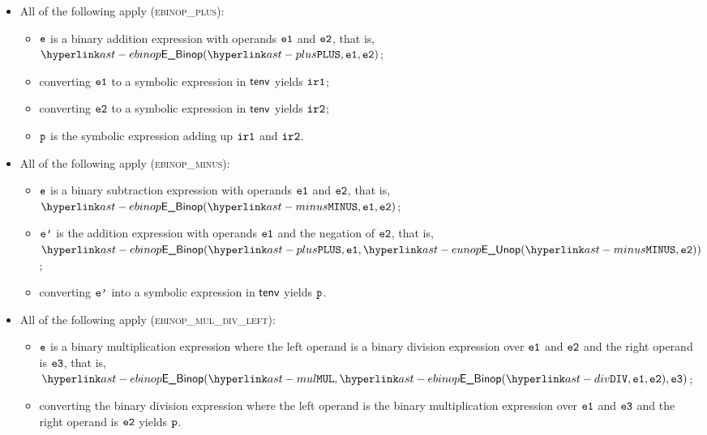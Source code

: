 \begin{itemize}
  \item All of the following apply (\textsc{ebinop\_plus}):
  \begin{itemize}
    \item $\texttt{e}$ is a binary addition expression with operands $\texttt{e1}$ and $\texttt{e2}$, that is, \\ $\EBinop(\PLUS, \veone, \vetwo)$;
    \item converting $\texttt{e1}$ to a symbolic expression in $\textsf{tenv}$ yields $\texttt{ir1}$\ProseOrTypeErrorOrCannotBeTransformed;
    \item converting $\texttt{e2}$ to a symbolic expression in $\textsf{tenv}$ yields $\texttt{ir2}$\ProseOrTypeErrorOrCannotBeTransformed;
    \item $\texttt{p}$ is the symbolic expression adding up $\texttt{ir1}$ and $\texttt{ir2}$.
  \end{itemize}

  \item All of the following apply (\textsc{ebinop\_minus}):
  \begin{itemize}
    \item $\texttt{e}$ is a binary subtraction expression with operands $\texttt{e1}$ and $\texttt{e2}$, that is, \\ $\EBinop(\MINUS, \veone, \vetwo)$;
    \item $\texttt{e'}$ is the addition expression with operands $\texttt{e1}$ and the negation of $\texttt{e2}$, that is, \\ $\EBinop(\PLUS, \veone, \EUnop(\MINUS, \vetwo))$;
    \item converting $\texttt{e'}$ into a symbolic expression in $\textsf{tenv}$ yields $\texttt{p}$\ProseOrTypeErrorOrCannotBeTransformed.
  \end{itemize}

  \item All of the following apply (\textsc{ebinop\_mul\_div\_left}):
  \begin{itemize}
    \item $\texttt{e}$ is a binary multiplication expression where the left operand is a binary division expression over $\texttt{e1}$ and $\texttt{e2}$
          and the right operand is $\texttt{e3}$, that is, \\ $\EBinop(\MUL, \EBinop(\DIV, \veone, \vetwo), \vethree)$;
    \item converting the binary division expression where the left operand is the binary multiplication expression  over $\texttt{e1}$
          and $\texttt{e3}$ and the right operand is $\texttt{e2}$ yields $\texttt{p}$\ProseOrTypeErrorOrCannotBeTransformed.
  \end{itemize}


\end{itemize}
